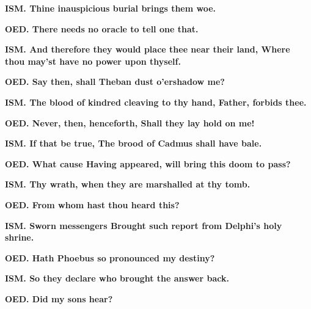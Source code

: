 \documentclass[11pt,letter]{book}
\begin{document}
\par \textbf{ISM. Thine inauspicious burial brings them woe.}
\par 

\par \textbf{OED. There needs no oracle to tell one that.}
\par 

\par \textbf{ISM. And therefore they would place thee near their land, Where thou may’st have no power upon thyself.}
\par 

\par \textbf{OED. Say then, shall Theban dust o’ershadow me?}
\par 

\par \textbf{ISM. The blood of kindred cleaving to thy hand, Father, forbids thee.}
\par 

\par \textbf{OED. Never, then, henceforth, Shall they lay hold on me!}
\par 

\par \textbf{ISM. If that be true, The brood of Cadmus shall have bale.}
\par 

\par \textbf{OED. What cause Having appeared, will bring this doom to pass?}
\par 

\par \textbf{ISM. Thy wrath, when they are marshalled at thy tomb.}
\par 

\par \textbf{OED. From whom hast thou heard this?}
\par 

\par \textbf{ISM. Sworn messengers Brought such report from Delphi’s holy shrine.}
\par 

\par \textbf{OED. Hath Phoebus so pronounced my destiny?}
\par 

\par \textbf{ISM. So they declare who brought the answer back.}
\par 

\par \textbf{OED. Did my sons hear?}
\par 
\end{document}
